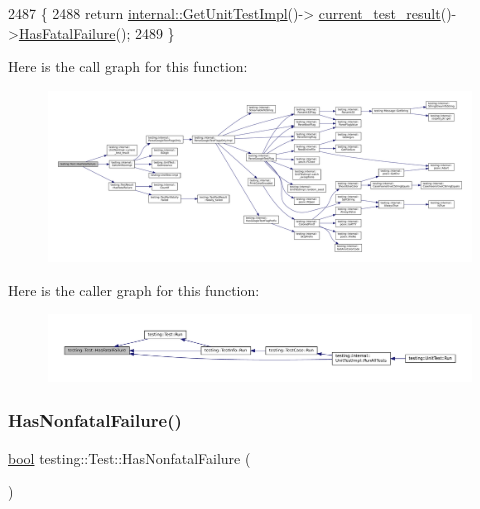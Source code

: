 \begin{DoxyCode}
2487                            \{
2488   \textcolor{keywordflow}{return} \hyperlink{namespacetesting_1_1internal_a9bd0caf5d16512de38b39599c13ee634}{internal::GetUnitTestImpl}()->
      \hyperlink{classtesting_1_1internal_1_1UnitTestImpl_aba3caef4ad23ce98be80250aeb0cc787}{current\_test\_result}()->\hyperlink{classtesting_1_1TestResult_a30e00d4076ae07fb5ad7b623d9dc1fe4}{HasFatalFailure}();
2489 \}
\end{DoxyCode}
Here is the call graph for this function\+:
\nopagebreak
\begin{figure}[H]
\begin{center}
\leavevmode
\includegraphics[width=350pt]{classtesting_1_1Test_aa8d0725cfb519f82eaf4fd2d2f46d97d_cgraph}
\end{center}
\end{figure}
Here is the caller graph for this function\+:
\nopagebreak
\begin{figure}[H]
\begin{center}
\leavevmode
\includegraphics[width=350pt]{classtesting_1_1Test_aa8d0725cfb519f82eaf4fd2d2f46d97d_icgraph}
\end{center}
\end{figure}
\mbox{\label{classtesting_1_1Test_a3b933cea62eff67a05e23aa07f38bf29}} 
\subsubsection{\texorpdfstring{Has\+Nonfatal\+Failure()}{HasNonfatalFailure()}}
{\footnotesize\ttfamily \hyperlink{classbool}{bool} testing\+::\+Test\+::\+Has\+Nonfatal\+Failure (\begin{DoxyParamCaption}{ }\end{DoxyParamCaption})\hspace{0.3cm}{\ttfamily [static]}}



